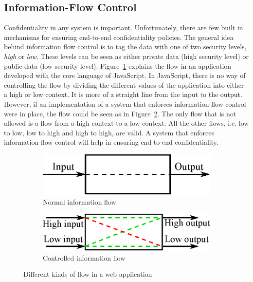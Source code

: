 \subsection{Information-Flow Control}
Confidentiality in any system is important. Unfortunately, there are few built in mechanisms for ensuring end-to-end confidentiality policies.\cite{ifc-jsac} The general idea behind information flow control is to tag the data with one of two security levels, \emph{high} or \emph{low}. These levels can be seen as either private data (high security level) or public data (low security level). Figure~\ref{fig:normal_flow} explains the flow in an application developed with the core language of JavaScript. In JavaScript, there is no way of controlling the flow by dividing the different values of the application into either a high or low context. It is more of a straight line from the input to the output. However, if an implementation of a system that enforces information-flow control were in place, the flow could be seen as in Figure~\ref{fig:controlled_flow}. The only flow that is not allowed is a flow from a high context to a low context. All the other flows, i.e. low to low, low to high and high to high, are valid. A system that enforces information-flow control will help in ensuring end-to-end confidentiality.
\begin{figure}[h]
  \begin{subfigure}{.5\textwidth}
    \includegraphics[scale=0.65]{images/flow_normal.eps}
    \caption{Normal information flow}
    \label{fig:normal_flow}
  \end{subfigure}
  \begin{subfigure}{.5\textwidth}
    \includegraphics[scale=0.65]{images/flow_controlled.eps}
    \caption{Controlled information flow}
    \label{fig:controlled_flow}
  \end{subfigure}
  \caption{Different kinds of flow in a web application}
  \label{fig:flows}
\end{figure}
